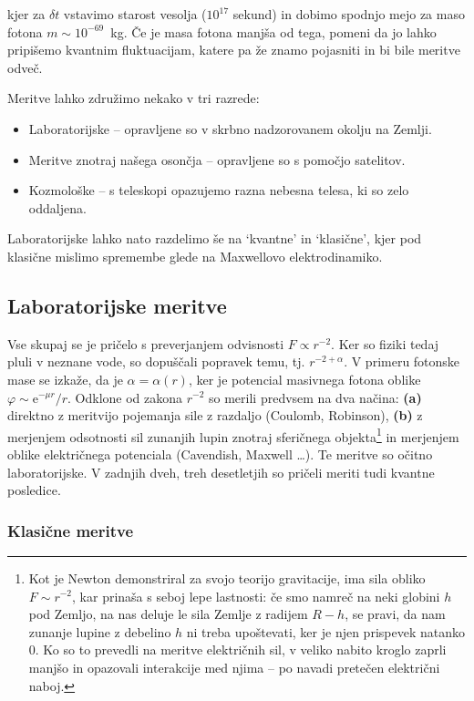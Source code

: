 \documentclass[a4paper, twocolumn, titlepage]{article}
\begin{document}
kjer za $\delta t$ vstavimo starost vesolja ($10^{17}$ sekund) in dobimo spodnjo mejo za maso fotona \hbox{$m \sim
10^{-69}$ kg}.
\v Ce je masa fotona manj\v sa od tega, pomeni da jo lahko pripi\v semo kvantnim fluktuacijam, katere pa \v ze znamo
pojasniti in bi bile meritve odve\v c.

Meritve lahko združimo nekako v tri razrede:
\begin{itemize}
	\item{Laboratorijske -- opravljene so v skrbno nadzorovanem okolju na Zemlji.}
	\item{Meritve znotraj na\v sega oson\v cja -- opravljene so s pomočjo satelitov.}
	\item{Kozmološke -- s teleskopi opazujemo razna nebesna telesa, ki so zelo oddaljena.}
\end{itemize}

Laboratorijske lahko nato razdelimo še na `kvantne' in `klasične', kjer pod klasične mislimo spremembe glede na Maxwellovo
elektrodinamiko.

\subsection{Laboratorijske meritve}

Vse skupaj se je pričelo s preverjanjem odvisnosti $F \propto r^{-2}$. Ker so fiziki tedaj pluli v neznane vode, so dopuščali
popravek temu, tj. $r^{-2 + \alpha}$. V primeru fotonske mase se izkaže, da je $\alpha = \alpha (r)$, ker je potencial masivnega
fotona oblike $\varphi \sim \text{e}^{-\mu r}/r$. Odklone od zakona $r^{-2}$ so merili predvsem na dva načina: \textbf{(a)} direktno
z meritvijo pojemanja sile z razdaljo (Coulomb, Robinson), \textbf{(b)} z merjenjem odsotnosti sil zunanjih lupin znotraj
sferičnega objekta\footnote{Kot je Newton demonstriral za svojo teorijo gravitacije, ima sila obliko $F \sim r^{-2}$, kar prinaša s
seboj lepe lastnosti: če smo namreč na neki globini $h$ pod Zemljo, na nas deluje le sila Zemlje z radijem $R - h$, se pravi, da
nam zunanje lupine z debelino $h$ ni treba upoštevati, ker je njen prispevek natanko 0. Ko so to prevedli na meritve električnih
sil, v veliko nabito kroglo zaprli manjšo in opazovali interakcije med njima -- po navadi pretečen električni naboj.} in
merjenjem oblike električnega potenciala (Cavendish, Maxwell \ldots). Te meritve so očitno laboratorijske. V zadnjih dveh, treh
desetletjih so pričeli meriti tudi kvantne posledice.

\subsubsection{Klasične meritve}
\end{document}
